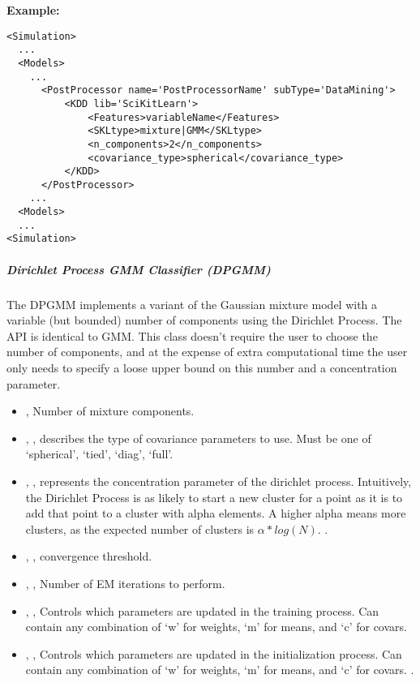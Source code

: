 \textbf{Example:}
\begin{lstlisting}[style=XML,morekeywords={subType}]
<Simulation>
  ...
  <Models>
    ...
      <PostProcessor name='PostProcessorName' subType='DataMining'>
          <KDD lib='SciKitLearn'>
              <Features>variableName</Features>
              <SKLtype>mixture|GMM</SKLtype>
              <n_components>2</n_components>
              <covariance_type>spherical</covariance_type>
          </KDD>
      </PostProcessor>
    ...
  <Models>
  ...
<Simulation>
\end{lstlisting}


\subparagraph{ Dirichlet Process GMM Classifier (DPGMM)} \hfill
\label{subparagraph:DPGMM}

The DPGMM implements a variant of the Gaussian mixture model with
 a variable (but bounded) number of components using the Dirichlet
 Process. The API is identical to GMM. This class doesn’t require
the user to choose the number of components, and at the expense of
 extra computational time the user only needs to specify a loose
 upper bound on this number and a concentration parameter.

\begin{itemize}
	\item {},  Number of mixture components. 
	\item {}, , describes the type of covariance parameters to use.
Must be one of ‘spherical’, ‘tied’, ‘diag’, ‘full’. 
	\item {}, ,
represents the concentration parameter of the dirichlet process.
Intuitively, the Dirichlet Process is as likely to start a new cluster
 for a point as it is to add that point to a cluster with alpha
 elements. A higher alpha means more clusters, as the expected
number of clusters is ${\alpha*log(N)}$. .
	\item {}, ,
convergence threshold. 
	\item {}, ,
Number of EM iterations to perform. 
	\item {}, ,
 Controls which parameters are updated in the training process.
Can contain any combination of ‘w’ for weights, ‘m’ for means, and
‘c’ for covars. 
	\item {}, , Controls which parameters are updated in the initialization
process. Can contain any combination of ‘w’ for weights, ‘m’ for means,
 and ‘c’ for covars. .
\end{itemize}

